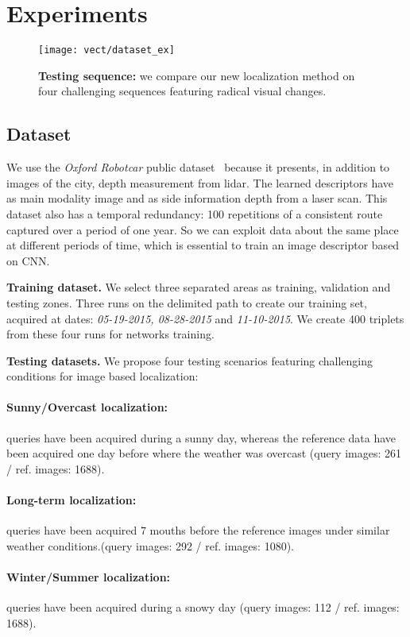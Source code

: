 \section{Experiments}
\label{sec:experiments}

\begin{figure}
	\center
	\texttt{[image: vect/dataset\_ex]}
	\caption{\label{fig:dataset} \textbf{Testing sequence:} we compare our new localization method on four challenging sequences featuring radical visual changes.}
\end{figure}

\subsection{Dataset}
\label{subsec:dataset}
	We use the \textit{Oxford Robotcar} public dataset~\cite{Maddern2016} because it presents, in addition to images of the city, depth measurement from lidar. The learned descriptors have as main modality image and as side information depth from a laser scan. This dataset also has a temporal redundancy: 100 repetitions of a consistent route captured over a period of one year. So we can exploit data about the same place at different periods of time, which is essential to train an image descriptor based on CNN.
	
\noindent\textbf{Training dataset.}
	We select three separated areas as training, validation and testing zones. Three runs on the delimited path to create our training set, acquired at dates: \textit{05-19-2015, 08-28-2015} and \textit{11-10-2015}. We create 400 triplets from these four runs for networks training.	
	
\noindent\textbf{Testing datasets.} We propose four testing scenarios featuring challenging conditions for image based localization:
	\paragraph{Sunny/Overcast localization:} queries have been acquired during a sunny day, whereas the reference data have been acquired one day before where the weather was overcast (query images: 261 / ref. images: 1688). 
	\paragraph{Long-term localization:} queries have been acquired 7 mouths before the reference images under similar weather conditions.(query images: 292 / ref. images: 1080).
	\paragraph{Winter/Summer localization:} queries have been acquired during a snowy day (query images: 112 / ref. images: 1688).
